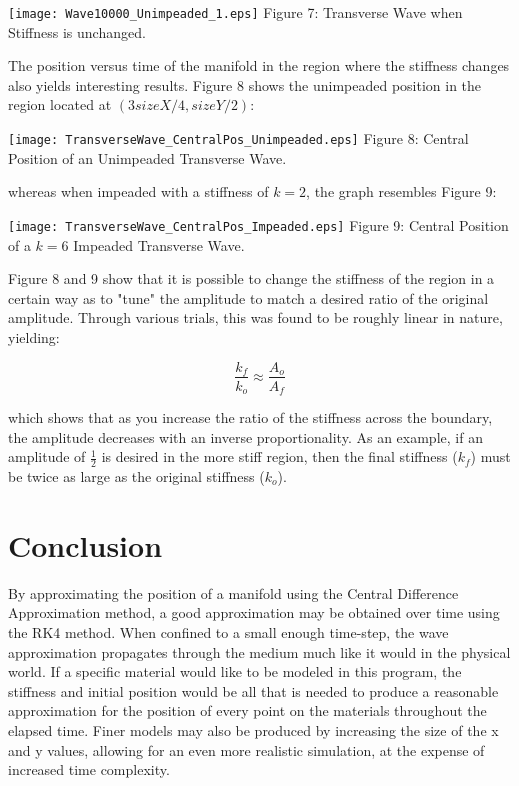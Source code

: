 \documentclass{article}
\begin{document}
\begin{multicols}{2}
\begin{center}
\texttt{[image: Wave10000\_Unimpeaded\_1.eps]}
\scriptsize{
Figure 7: Transverse Wave when Stiffness is unchanged.
}
\end{center}

The position versus time of the manifold in the region where the stiffness changes also yields interesting results. Figure 8 shows the unimpeaded position in the region located at $(3sizeX/4 , sizeY/2)$:

\begin{center}
\texttt{[image: TransverseWave\_CentralPos\_Unimpeaded.eps]}
\scriptsize{
Figure 8: Central Position of an Unimpeaded Transverse Wave.
}
\end{center}

whereas when impeaded with a stiffness of $k=2$, the graph resembles Figure 9:

\begin{center}
\texttt{[image: TransverseWave\_CentralPos\_Impeaded.eps]}
\scriptsize{
Figure 9: Central Position of a $k=6$ Impeaded Transverse Wave.
}
\end{center}

Figure 8 and 9 show that it is possible to change the stiffness of the region in a certain way as to "tune" the amplitude to match a desired ratio of the original amplitude. Through various trials, this was found to be roughly linear in nature, yielding:

\begin{equation}
    \label{equation6}
    \frac{k_f}{k_o} \approx \frac{A_o}{A_f}
\end{equation}

which shows that as you increase the ratio of the stiffness across the boundary, the amplitude decreases with an inverse proportionality. As an example, if an amplitude of $\frac{1}{2}$ is desired in the more stiff region, then the final stiffness ($k_f$) must be twice as large as the original stiffness ($k_o$).

\section{Conclusion}
By approximating the position of a manifold using the Central Difference Approximation method, a good approximation may be obtained over time using the RK4 method. When confined to a small enough time-step, the wave approximation propagates through the medium much like it would in the physical world. If a specific material would like to be modeled in this program, the stiffness and initial position would be all that is needed to produce a reasonable approximation for the position of every point on the materials throughout the elapsed time. Finer models may also be produced by increasing the size of the x and y values, allowing for an even more realistic simulation, at the expense of increased time complexity.

\end{multicols}
\end{document}
